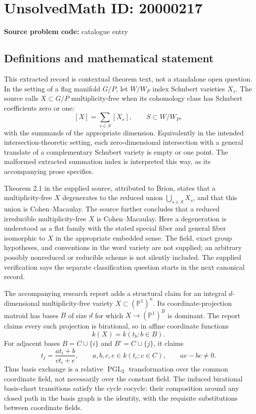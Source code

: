\documentclass[11pt]{article}
\newcommand{\PP}{\mathbb{P}}
\begin{document}
\section*{UnsolvedMath ID: 20000217}
\textbf{Source problem code:} catalogue entry
\subsection{Definitions and mathematical statement}
This extracted record is contextual theorem text, not a standalone open question. In the setting of a flag manifold $G/P$, let $W/W_P$ index Schubert varieties $X_s$. The source calls $X\subset G/P$ multiplicity-free when its cohomology class has Schubert coefficients zero or one:
\[
 [X]=\sum_{s\in S}[X_s],\qquad S\subset W/W_P,
\]
with the summands of the appropriate dimension. Equivalently in the intended intersection-theoretic setting, each zero-dimensional intersection with a general translate of a complementary Schubert variety is empty or one point. The malformed extracted summation index is interpreted this way, as its accompanying prose specifies.

Theorem 2.1 in the supplied source, attributed to Brion, states that a multiplicity-free $X$ degenerates to the reduced union $\bigcup_{s\in S}X_s$, and that this union is Cohen--Macaulay. The source further concludes that a reduced irreducible multiplicity-free $X$ is Cohen--Macaulay. Here a degeneration is understood as a flat family with the stated special fiber and general fiber isomorphic to $X$ in the appropriate embedded sense. The field, exact group hypotheses, and conventions in the word variety are not supplied; an arbitrary possibly nonreduced or reducible scheme is not silently included. The supplied verification says the separate classification question starts in the next canonical record.

The accompanying research report adds a structural claim for an integral $d$-dimensional multiplicity-free variety $X\subset(\PP^1)^n$. Its coordinate-projection matroid has bases $B$ of size $d$ for which $X\to(\PP^1)^B$ is dominant. The report claims every such projection is birational, so in affine coordinate functions
\[
 k(X)=k(t_b:b\in B).
\]
For adjacent bases $B=C\cup\{i\}$ and $B'=C\cup\{j\}$, it claims
\[
 t_j=\frac{a t_i+b}{c t_i+e},\qquad
 a,b,c,e\in k(t_c:c\in C),\qquad ae-bc\ne0.
\]
Thus basis exchange is a relative $\operatorname{PGL}_2$ transformation over the common coordinate field, not necessarily over the constant field. The induced birational basis-chart transitions satisfy the cycle cocycle: their composition around any closed path in the basis graph is the identity, with the requisite substitutions between coordinate fields.
\end{document}
